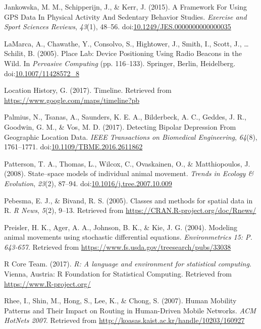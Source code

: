 \documentclass[english,man]{apa6}
\theoremstyle{definition}
\theoremstyle{definition}
\theoremstyle{definition}
\theoremstyle{remark}
\begin{document}
\hypertarget{ref-jankowska_framework_2015}{}
Jankowska, M. M., Schipperijn, J., \& Kerr, J. (2015). A Framework For
Using GPS Data In Physical Activity And Sedentary Behavior Studies.
\emph{Exercise and Sport Sciences Reviews}, \emph{43}(1), 48--56.
doi:\href{https://doi.org/10.1249/JES.0000000000000035}{10.1249/JES.0000000000000035}

\hypertarget{ref-lamarca_place_2005}{}
LaMarca, A., Chawathe, Y., Consolvo, S., Hightower, J., Smith, I.,
Scott, J., \ldots{} Schilit, B. (2005). Place Lab: Device Positioning
Using Radio Beacons in the Wild. In \emph{Pervasive Computing} (pp.
116--133). Springer, Berlin, Heidelberg.
doi:\href{https://doi.org/10.1007/11428572_8}{10.1007/11428572\_8}

\hypertarget{ref-location_history_timeline_2017}{}
Location History, G. (2017). Timeline. Retrieved from
\url{https://www.google.com/maps/timeline?pb}

\hypertarget{ref-palmius_detecting_2017}{}
Palmius, N., Tsanas, A., Saunders, K. E. A., Bilderbeck, A. C., Geddes,
J. R., Goodwin, G. M., \& Vos, M. D. (2017). Detecting Bipolar
Depression From Geographic Location Data. \emph{IEEE Transactions on
Biomedical Engineering}, \emph{64}(8), 1761--1771.
doi:\href{https://doi.org/10.1109/TBME.2016.2611862}{10.1109/TBME.2016.2611862}

\hypertarget{ref-patterson_statespace_2008}{}
Patterson, T. A., Thomas, L., Wilcox, C., Ovaskainen, O., \&
Matthiopoulos, J. (2008). State--space models of individual animal
movement. \emph{Trends in Ecology \& Evolution}, \emph{23}(2), 87--94.
doi:\href{https://doi.org/10.1016/j.tree.2007.10.009}{10.1016/j.tree.2007.10.009}

\hypertarget{ref-sp1}{}
Pebesma, E. J., \& Bivand, R. S. (2005). Classes and methods for spatial
data in R. \emph{R News}, \emph{5}(2), 9--13. Retrieved from
\url{https://CRAN.R-project.org/doc/Rnews/}

\hypertarget{ref-preisler_modeling_2004}{}
Preisler, H. K., Ager, A. A., Johnson, B. K., \& Kie, J. G. (2004).
Modeling animal movements using stochastic differential equations.
\emph{Environmetrics 15: P. 643-657}. Retrieved from
\url{https://www.fs.usda.gov/treesearch/pubs/33038}

\hypertarget{ref-base}{}
R Core Team. (2017). \emph{R: A language and environment for statistical
computing}. Vienna, Austria: R Foundation for Statistical Computing.
Retrieved from \url{https://www.R-project.org/}

\hypertarget{ref-rhee_human_2007}{}
Rhee, I., Shin, M., Hong, S., Lee, K., \& Chong, S. (2007). Human
Mobility Patterns and Their Impact on Routing in Human-Driven Mobile
Networks. \emph{ACM HotNets 2007}. Retrieved from
\url{http://koasas.kaist.ac.kr/handle/10203/160927}
\end{document}
